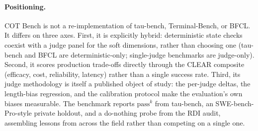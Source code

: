 \paragraph{Positioning.} COT Bench is not a re-implementation of tau-bench,
Terminal-Bench, or BFCL. It differs on three axes. First, it is explicitly hybrid:
deterministic state checks coexist with a judge panel for the soft dimensions,
rather than choosing one (tau-bench and BFCL are deterministic-only;
single-judge benchmarks are judge-only). Second, it scores production trade-offs
directly through the CLEAR composite (efficacy, cost, reliability, latency) rather
than a single success rate. Third, its judge methodology is itself a published
object of study: the per-judge deltas, the length-bias regression, and the
calibration protocol make the evaluation's own biases measurable. The benchmark
reports $\text{pass}^k$ from tau-bench, an SWE-bench-Pro-style private holdout, and
a do-nothing probe from the RDI audit, assembling lessons from across the field
rather than competing on a single one.
